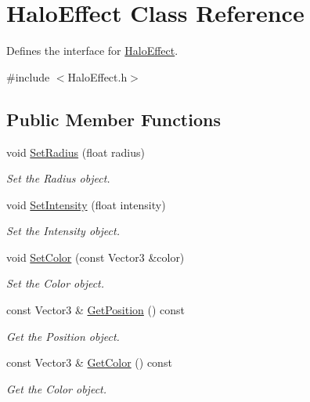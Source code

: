 \hypertarget{classHaloEffect}{}\section{Halo\+Effect Class Reference}
\label{classHaloEffect}


Defines the interface for \hyperlink{classHaloEffect}{Halo\+Effect}.  




{\ttfamily \#include $<$Halo\+Effect.\+h$>$}

\subsection*{Public Member Functions}
\begin{DoxyCompactItemize}
\item 
void \hyperlink{classHaloEffect_abee34a573ebce91df24cb8780730d5bf}{Set\+Radius} (float radius)
\begin{DoxyCompactList}\small\item\em Set the Radius object. \end{DoxyCompactList}\item 
void \hyperlink{classHaloEffect_a7d8f0434fb0277d93f64b1e9eecacf76}{Set\+Intensity} (float intensity)
\begin{DoxyCompactList}\small\item\em Set the Intensity object. \end{DoxyCompactList}\item 
void \hyperlink{classHaloEffect_a71a0daca89eeaca58de0ac973b568fa7}{Set\+Color} (const Vector3 \&color)
\begin{DoxyCompactList}\small\item\em Set the Color object. \end{DoxyCompactList}\item 
const Vector3 \& \hyperlink{classHaloEffect_a775ccc873130c615bd4c1fbd0abf7e11}{Get\+Position} () const
\begin{DoxyCompactList}\small\item\em Get the Position object. \end{DoxyCompactList}\item 
const Vector3 \& \hyperlink{classHaloEffect_a103a5a12331c33b197a410292cddd341}{Get\+Color} () const
\begin{DoxyCompactList}\small\item\em Get the Color object. \end{DoxyCompactList}\item 

\end{DoxyCompactItemize}
